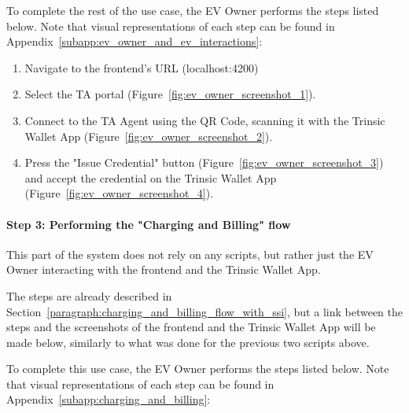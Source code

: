To complete the rest of the use case, the EV Owner performs the steps listed below. Note that visual representations of each step can be found in Appendix~\ref{subapp:ev_owner_and_ev_interactions}:

\begin{enumerate}
    \item Navigate to the frontend's URL (localhost:4200)
    \item Select the TA portal (Figure~\ref{fig:ev_owner_screenshot_1}).
    \item Connect to the TA Agent using the QR Code, scanning it with the Trinsic Wallet App (Figure~\ref{fig:ev_owner_screenshot_2}).
    \item Press the "Issue Credential" button (Figure~\ref{fig:ev_owner_screenshot_3}) and accept the credential on the Trinsic Wallet App (Figure~\ref{fig:ev_owner_screenshot_4}).
\end{enumerate}

\paragraph{Step 3: Performing the "Charging and Billing" flow}

This part of the system does not rely on any scripts, but rather just the EV Owner interacting with the frontend and the Trinsic Wallet App.

The steps are already described in Section~\ref{paragraph:charging_and_billing_flow_with_ssi}, but a link between the steps and the screenshots of the frontend and the Trinsic Wallet App will be made below, similarly to what was done for the previous two scripts above.

To complete this use case, the EV Owner performs the steps listed below. Note that visual representations of each step can be found in Appendix~\ref{subapp:charging_and_billing}:

